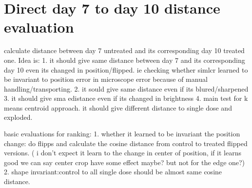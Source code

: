 \begin{table}[H]
    \centering
    \caption{Evaluation Results on Euclidean}
    \label{tab:professional_table}
\end{table}



\section{Direct day 7 to day 10 distance evaluation}\label{sec: distance}
calculate distance between day 7 untreated and its corresponding day 10 treated one.
Idea is:
1. it should give same distance between day 7 and its corresponding day 10
 even its changed in position/flipped. ie checking whether simlcr learned to 
 be invariant to position error in microscope error because of manual 
 handling/transporting.
2. it sould give same distance even if its blured/sharpened
3. it should give sma edistance even if its changed in brightness
4. main test for k means centroid approach. it should give different distance to single dose and exploded.


basic evaluations for ranking:
1.
whether it learned to be invariant the position change:
do flipps and calculate the cosine distance from control to treated flipped versions. ( i don't expect it learn to the change in center of position, 
if it learns good we can say center crop have some effect maybe? but not for the edge one?)
2. 
shape invariant:control to all single dose should be almost same cosine distance.


